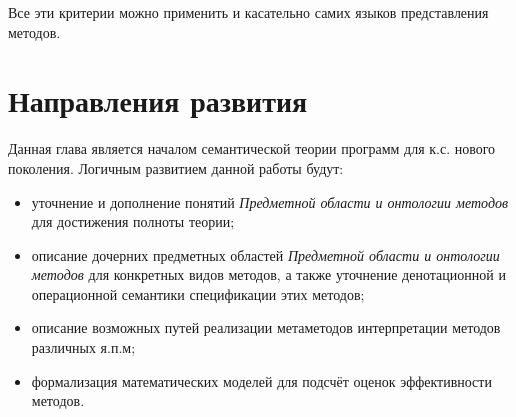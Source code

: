 Все эти критерии можно применить и касательно самих языков представления методов.

\section{Направления развития}

Данная глава является началом семантической теории программ для к.с. нового поколения. Логичным развитием данной работы будут:

\begin{itemize}
    \item уточнение и дополнение понятий \textit{Предметной области и онтологии методов} для достижения полноты теории;
    \item описание дочерних предметных областей \textit{Предметной области и онтологии методов} для конкретных видов методов, а также уточнение денотационной и операционной семантики спецификации этих методов;
    \item описание возможных путей реализации метаметодов интерпретации методов различных я.п.м;
    \item формализация математических моделей для подсчёт оценок эффективности методов.
\end{itemize}
